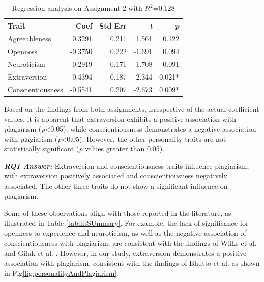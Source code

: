 \begin{table}[ht]
  \centering
  \caption{Regression analysis on Assignment 2 with $R^2$=0.128\\\label{tab:assign2Regression}}
    \vspace{-12pt}
  \begin{tabular}{p{2.5cm}rrrr}
    \toprule
    Trait & Coef & Std Err & \textit{t} & \textit{p}\\\midrule
    Agreeableness & 0.3291 & 0.211 & 1.561 & 0.122 \\
    Openness & -0.3750 & 0.222 & -1.691 & 0.094\\
    Neuroticism & -0.2919 & 0.171 & -1.708 &  0.091\\
    Extraversion & 0.4394 & 0.187 & 2.344 & 0.021*\\
    Conscientiousness & -0.5541 & 0.207 & -2.673 & 0.009*\\\bottomrule
  \end{tabular}\vspace{-8pt}
\end{table}

Based on the findings from both assignments, irrespective of the actual coefficient values, it is apparent that extraversion exhibits a positive association with plagiarism (\textit{p}<0.05), while conscientiousness demonstrates a negative association with plagiarism (\textit{p}<0.05). However, the other personality traits are not statistically significant (\textit{p} values greater than 0.05).

\vspace{4pt}
\begin{mdframed}
\textbf{\textit{RQ1 Answer:}} Extraversion and conscientiousness traits influence plagiarism, with extraversion positively associated and conscientiousness negatively associated. The other three traits do not show a significant influence on plagiarism. 
\end{mdframed}
\vspace{4pt}

Some of these observations align with those reported in the literature, as illustrated in Table \ref{tab:litSUmmary}. For example, the lack of significance for openness to experience and neuroticism, as well as the negative association of conscientiousness with plagiarism, are consistent with the findings of Wilks et al. \cite{Wilks2016-WILPTA-3} and Giluk et al. \cite{Giluk2015BigFP}. However, in our study, extraversion demonstrates a positive association with plagiarism, consistent with the findings of Bhutto et al. \cite{Bhutto2019ACS} as shown in Fig\ref{fig:personalityAndPlagiarism}.

